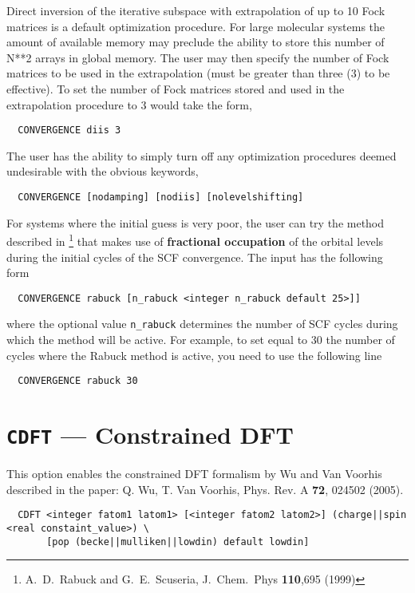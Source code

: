 Direct inversion of the iterative subspace with extrapolation of up to
10 Fock matrices is a default optimization procedure.  For large
molecular systems the amount of available memory may preclude the ability to
store this number of N**2 arrays in global memory.  The user may then
specify the number of Fock matrices to be used in the extrapolation
(must be greater than three (3) to be effective).  To set the number of
Fock matrices stored and used in the extrapolation procedure to 3
would take the form,
\begin{verbatim}
  CONVERGENCE diis 3
\end{verbatim}

The user has the ability to simply turn off any optimization
procedures deemed undesirable with the obvious keywords,
\begin{verbatim}
  CONVERGENCE [nodamping] [nodiis] [nolevelshifting]
\end{verbatim}


For systems where the initial guess is very poor, the user can try the
method described in
\footnote{A.~D.~Rabuck and G.~E.~Scuseria, J.~Chem.~Phys {\bf 110},695
(1999)}
that makes use of {\bf fractional occupation} of the orbital levels during
the initial cycles of the SCF convergence. The input has the following form

\begin{verbatim}
  CONVERGENCE rabuck [n_rabuck <integer n_rabuck default 25>]]
\end{verbatim}

where the optional value {\tt n\_rabuck} determines the number of SCF
cycles during which the method will be active. For example, to
set equal to 30 the number of cycles where the Rabuck method is
active, you need to use the following line
\begin{verbatim}
  CONVERGENCE rabuck 30
\end{verbatim}

\section{{\tt CDFT} --- Constrained DFT}
\label{cdft}

This option enables the constrained DFT formalism by Wu and Van Voorhis described 
in the paper: Q. Wu, T. Van Voorhis, Phys. Rev. A {\bf 72}, 024502 (2005). 

\begin{verbatim}
  CDFT <integer fatom1 latom1> [<integer fatom2 latom2>] (charge||spin <real constaint_value>) \
       [pop (becke||mulliken||lowdin) default lowdin]
\end{verbatim}

